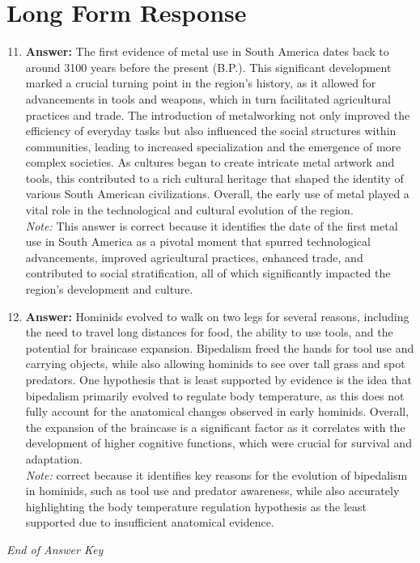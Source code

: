 \documentclass[12pt]{article}
\begin{document}
\section*{Long Form Response}
\begin{enumerate}[label=\arabic*.]
\setcounter{enumi}{10}
\item \textbf{Answer:} The first evidence of metal use in South America dates back to around 3100 years before the present (B.P.). This significant development marked a crucial turning point in the region's history, as it allowed for advancements in tools and weapons, which in turn facilitated agricultural practices and trade. The introduction of metalworking not only improved the efficiency of everyday tasks but also influenced the social structures within communities, leading to increased specialization and the emergence of more complex societies. As cultures began to create intricate metal artwork and tools, this contributed to a rich cultural heritage that shaped the identity of various South American civilizations. Overall, the early use of metal played a vital role in the technological and cultural evolution of the region.
\\ \textit{Note:} This answer is correct because it identifies the date of the first metal use in South America as a pivotal moment that spurred technological advancements, improved agricultural practices, enhanced trade, and contributed to social stratification, all of which significantly impacted the region's development and culture.
\item \textbf{Answer:} Hominids evolved to walk on two legs for several reasons, including the need to travel long distances for food, the ability to use tools, and the potential for braincase expansion. Bipedalism freed the hands for tool use and carrying objects, while also allowing hominids to see over tall grass and spot predators. One hypothesis that is least supported by evidence is the idea that bipedalism primarily evolved to regulate body temperature, as this does not fully account for the anatomical changes observed in early hominids. Overall, the expansion of the braincase is a significant factor as it correlates with the development of higher cognitive functions, which were crucial for survival and adaptation.
\\ \textit{Note:} correct because it identifies key reasons for the evolution of bipedalism in hominids, such as tool use and predator awareness, while also accurately highlighting the body temperature regulation hypothesis as the least supported due to insufficient anatomical evidence.
\end{enumerate}

\vfill
\noindent\textit{End of Answer Key}
\end{document}
